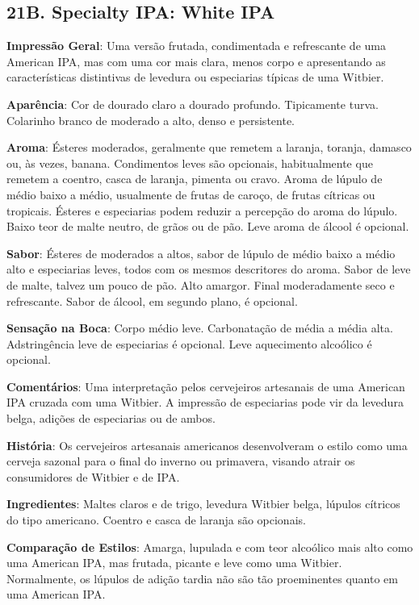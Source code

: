 \subsection*{21B. Specialty IPA: White IPA}

\textbf{Impressão Geral}: Uma versão frutada, condimentada e refrescante de uma American IPA, mas com uma cor mais clara, menos corpo e apresentando as características distintivas de levedura ou especiarias típicas de uma Witbier.

\textbf{Aparência}: Cor de dourado claro a dourado profundo. Tipicamente turva. Colarinho branco de moderado a alto, denso e persistente.

\textbf{Aroma}: Ésteres moderados, geralmente que remetem a laranja, toranja, damasco ou, às vezes, banana. Condimentos leves são opcionais, habitualmente que remetem a coentro, casca de laranja, pimenta ou cravo. Aroma de lúpulo de médio baixo a médio, usualmente de frutas de caroço, de frutas cítricas ou tropicais. Ésteres e especiarias podem reduzir a percepção do aroma do lúpulo. Baixo teor de malte neutro, de grãos ou de pão. Leve aroma de álcool é opcional.

\textbf{Sabor}: Ésteres de moderados a altos, sabor de lúpulo de médio baixo a médio alto e especiarias leves, todos com os mesmos descritores do aroma. Sabor de leve de malte, talvez um pouco de pão. Alto amargor. Final moderadamente seco e refrescante. Sabor de álcool, em segundo plano, é opcional.

\textbf{Sensação na Boca}: Corpo médio leve. Carbonatação de média a média alta. Adstringência leve de especiarias é opcional. Leve aquecimento alcoólico é opcional.

\textbf{Comentários}: Uma interpretação pelos cervejeiros artesanais de uma American IPA cruzada com uma Witbier. A impressão de especiarias pode vir da levedura belga, adições de especiarias ou de ambos.

\textbf{História}: Os cervejeiros artesanais americanos desenvolveram o estilo como uma cerveja sazonal para o final do inverno ou primavera, visando atrair os consumidores de Witbier e de IPA.

\textbf{Ingredientes}: Maltes claros e de trigo, levedura Witbier belga, lúpulos cítricos do tipo americano. Coentro e casca de laranja são opcionais.

\textbf{Comparação de Estilos}: Amarga, lupulada e com teor alcoólico mais alto como uma American IPA, mas frutada, picante e leve como uma Witbier. Normalmente, os lúpulos de adição tardia não são tão proeminentes quanto em uma American IPA.

